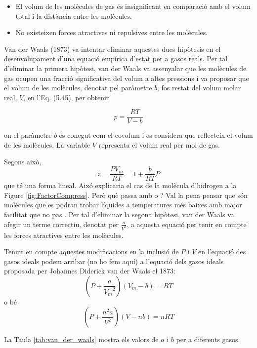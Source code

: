 \begin{itemize}
    \item El volum de les molècules de gas és insignificant en comparació amb el volum total i la distància entre les molècules.
    \item No existeixen forces atractives ni repulsives entre les molècules.
\end{itemize}

Van der Waals (1873) va intentar eliminar aquestes dues hipòtesis en el desenvolupament d'una equació empírica d'estat per a gasos reals. Per tal d'eliminar la primera hipòtesi, van der Waals va assenyalar que les molècules de gas ocupen una fracció significativa del volum a altes pressions i va proposar que el volum de les molècules, denotat pel paràmetre $b$, fos restat del volum molar real, $V$, en l'Eq. (5.45), per obtenir

\[
p = \frac{RT}{V - b}
\]

on el paràmetre $b$ és conegut com el covolum i es considera que reflecteix el volum de les molècules. La variable $V$ representa el volum real per mol de gas.

Segons això,
\[z=\frac{PV_m}{RT}=1+\frac{b}{RT}P\]
que té una forma lineal. Aixó explicaria el cas de la molècula d'hidrogen a la Figure \ref{fig:FactorCompress}.
Però què passa amb  o ? Val la pena pensar que són molècules que es podran trobar líquides a temperatures més baixes amb major facilitat que no pas . 
Per tal d'eliminar la segona hipòtesi, van der Waals va afegir un terme correctiu, denotat per $\frac{a}{V^2}$, a aquesta equació per tenir en compte les forces atractives entre les molècules.

Tenint en compte aquestes modificacions en la inclusió de $P$ i $V$ en l'equació des gasos ideals podem arribar (no ho fem aquí) a l'equació dels gasos ideals proposada per Johannes Diderick van der Waals el 1873:
\[
\left( P + \frac{a}{{V_m}^2} \right) (V_m -b)=RT
\]
o bé
\begin{equation}
\left( P + \frac{n^2 a}{V^2} \right) (V -nb)=nRT
\label{Eq:vdW}
\end{equation}

La Taula \ref{tab:van_der_waals} mostra els valors de $a$ i $b$ per a diferents gasos.


